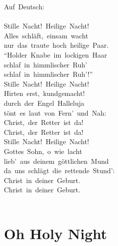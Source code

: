 \documentclass[]{book}
\let\stdsection\section
\renewcommand\section{\clearpage\stdsection}
\begin{document}
Auf~Deutsch:\\
~\\
Stille~Nacht!~Heilige~Nacht!\\
Alles~schläft,~einsam~wacht\\
nur~das~traute~hoch~heilige~Paar.\\
``Holder~Knabe~im~lockigen~Haar\\
schlaf~in~himmlischer~Ruh'\\
schlaf~in~himmlischer~Ruh'!''\\
Stille~Nacht!~Heilige~Nacht!\\
Hirten~erst,~kundgemacht!\\
durch~der~Engel~Halleluja\\
tönt~es~laut~von~Fern'~und~Nah:\\
Christ,~der~Retter~ist~da!\\
Christ,~der~Retter~ist~da!\\
Stille~Nacht!~Heilige~Nacht!\\
Gottes~Sohn,~o~wie~lacht\\
lieb'~aus~deinem~göttlichen~Mund\\
da~uns~schlägt~die~rettende~Stund':\\
Christ~in~deiner~Geburt.\\
Christ~in~deiner~Geburt.\\
~\\

\hypertarget{oh-holy-night}{%
\section{Oh Holy Night}\label{oh-holy-night}}
\end{document}
